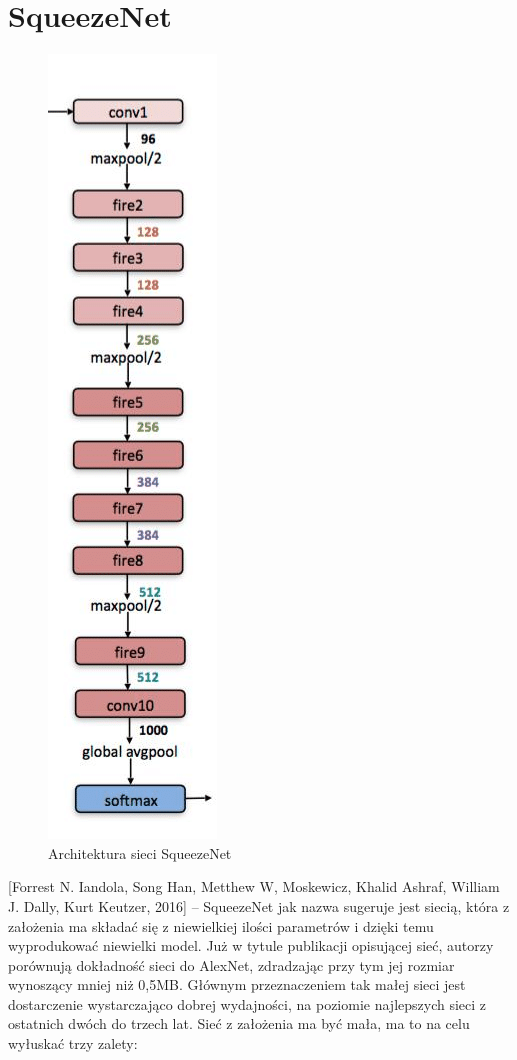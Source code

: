 \documentclass[12pt,a4paper,twoside,titlepage,openright]{book}
\begin{document}
\section{SqueezeNet}
\begin{figure}[ht]
	\centering
			\includegraphics[resolution=100, scale=0.65]{SqueezeNet.png}
		\caption{Architektura sieci SqueezeNet}
\end{figure}
[Forrest N. Iandola, Song Han, Metthew W, Moskewicz, Khalid Ashraf, William J. Dally, Kurt Keutzer, 2016] -- SqueezeNet jak nazwa sugeruje jest siecią, która z założenia ma składać się z niewielkiej ilości parametrów i dzięki temu wyprodukować niewielki model. Już w tytule publikacji opisującej sieć, autorzy porównują dokładność sieci do AlexNet, zdradzając przy tym jej rozmiar wynoszący mniej niż 0,5MB. Głównym przeznaczeniem tak małej sieci jest dostarczenie wystarczająco dobrej wydajności, na poziomie najlepszych sieci z ostatnich dwóch do trzech lat. Sieć z założenia ma być mała, ma to na celu wyłuskać trzy zalety:
\end{document}
